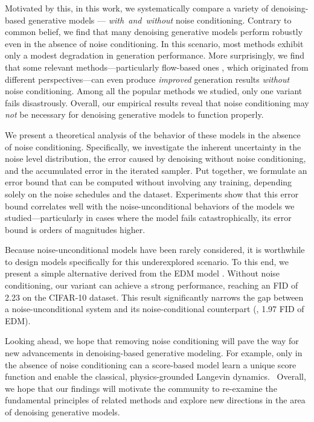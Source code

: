 Motivated by this, in this work, we systematically compare a variety of denoising-based generative models --- \mbox{\textit{with and without}} noise conditioning. Contrary to common belief, we find that many denoising generative models perform robustly even in the absence of noise conditioning. In this scenario, most methods exhibit only a modest degradation in generation performance. More surprisingly, we find that some relevant methods---particularly flow-based ones \cite{lipman2023flow,liu2023flow}, which originated from different perspectives---can even produce \textit{improved} generation results \textit{without} noise conditioning. Among all the popular methods we studied, only one variant fails disastrously. Overall, our empirical results reveal that noise conditioning may \textit{not} be necessary for denoising generative models to function properly.

We present a theoretical analysis of the behavior of these models in the absence of noise conditioning. Specifically, we investigate the inherent uncertainty in the noise level distribution, the error caused by denoising without noise conditioning, and the accumulated error in the iterated sampler. Put together, we formulate an error bound that can be computed without involving any training, depending solely on the noise schedules and the dataset. Experiments show that this error bound correlates well with the noise-unconditional behaviors of the models we studied---particularly in cases where the model fails catastrophically, its error bound is orders of magnitudes higher.

Because noise-unconditional models have been rarely considered, it is worthwhile to design models specifically for this underexplored scenario. To this end, we present a simple alternative derived from the EDM model \cite{karras2022edm}. Without noise conditioning, our variant can achieve a strong performance, reaching an FID of 2.23 on the CIFAR-10 dataset. This result significantly narrows the gap between a noise-unconditional system and its noise-conditional counterpart (\eg, 1.97 FID of EDM).

Looking ahead, we hope that removing noise conditioning will pave the way for new advancements in denoising-based generative modeling. For example, only in the absence of noise conditioning can a score-based model learn a unique score function and enable the classical, physics-grounded Langevin dynamics.\footnotemark 
~Overall, we hope that our findings will motivate the community to re-examine the fundamental principles of related methods and explore new directions in the area of denoising generative models.










  






    
    

